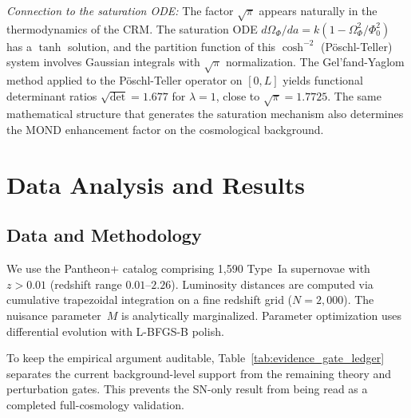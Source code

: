 \documentclass[aps,prd,twocolumn,superscriptaddress,nofootinbib,floatfix]{revtex4-2}
\begin{document}
\textit{Connection to the saturation ODE:} The factor $\sqrt{\pi}$ appears naturally in the thermodynamics of the CRM. The saturation ODE $d\Omega_\Phi/da = k(1 - \Omega_\Phi^2/\Phi_0^2)$ has a $\tanh$ solution, and the partition function of this $\cosh^{-2}$ (P\"oschl-Teller) system involves Gaussian integrals with $\sqrt{\pi}$ normalization. The Gel'fand-Yaglom method applied to the P\"oschl-Teller operator on $[0,L]$ yields functional determinant ratios $\sqrt{\det} = 1.677$ for $\lambda = 1$, close to $\sqrt{\pi} = 1.7725$. The same mathematical structure that generates the saturation mechanism also determines the MOND enhancement factor on the cosmological background.


\section{Data Analysis and Results}
\label{sec:analysis}

\subsection{Data and Methodology}

We use the Pantheon+ catalog \cite{Scolnic2022} comprising 1,590 Type~Ia supernovae with $z > 0.01$ (redshift range $0.01$--$2.26$). Luminosity distances are computed via cumulative trapezoidal integration on a fine redshift grid ($N = 2{,}000$). The nuisance parameter~$M$ is analytically marginalized. Parameter optimization uses differential evolution with L-BFGS-B polish.

To keep the empirical argument auditable, Table~\ref{tab:evidence_gate_ledger} separates the current background-level support from the remaining theory and perturbation gates. This prevents the SN-only result from being read as a completed full-cosmology validation.
\end{document}

